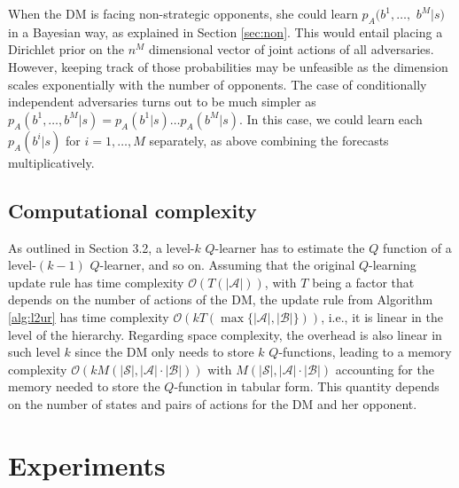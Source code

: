 When the DM is facing non-strategic opponents, she could learn $p_A(b^1, \dots,$ $ b^M \vert s)$ in a Bayesian way, as explained in Section \ref{sec:non}. This would entail placing a Dirichlet prior on the $n^M$ dimensional vector of joint actions of all adversaries. However, keeping track of those probabilities may be unfeasible as the dimension scales exponentially with the number of opponents. The case  of conditionally independent adversaries turns out to be much simpler as
$p_A(b^1, \dots, b^M \vert s) = p_A(b^1 \vert s) \dots p_A(b^M \vert s)$. In this case, we could learn each $p_A(b^i \vert s)$ for $i=1, \dots, M$ separately, as above combining the forecasts  
multiplicatively.

\subsection{Computational complexity}\label{sec:cc}

As outlined in Section 3.2, a level-$k$ $Q$-learner has to estimate the $Q$ function
of a level-$(k-1)$ $Q$-learner, and so on. Assuming that the original $Q$-learning 
update rule has time complexity $\mathcal{O}(T(|\mathcal{A}|))$, with $T$ being a factor that depends on the number of actions of the DM, the update rule from 
Algorithm \ref{alg:l2ur} has time complexity $\mathcal{O}(kT(\max \lbrace |\mathcal{A}|,  |\mathcal{B}|\rbrace))$, i.e.,
it is linear in the level of the hierarchy. %
Regarding space complexity, the overhead is also linear in such level $k$ since the DM only needs to store $k$ $Q$-functions, leading to a memory complexity $\mathcal{O}(kM(|\mathcal{S}|,|\mathcal{A}| \cdot |\mathcal{B}|))$ with $M(|\mathcal{S}|,|\mathcal{A}| \cdot |\mathcal{B}|)$ accounting for the memory needed to store the $Q$-function in tabular form. This quantity depends on the number of states and pairs of actions for the DM and her opponent.



\section{Experiments}\label{sec:exps_ararl}

